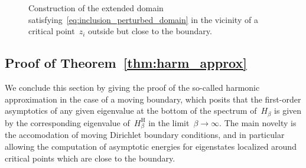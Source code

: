 \documentclass[10pt]{article}
\newcommand{\1}{\mathbbm 1}
\begin{document}
\begin{figure}
{\begin{tikzpicture}
        \end{tikzpicture}
    }
        \caption{Construction of the extended domain satisfying~\eqref{eq:inclusion_perturbed_domain} in the vicinity of a critical point~$z_i$ outside but close to the boundary.}
    \end{figure}

    \subsection{Proof of Theorem~\ref{thm:harm_approx}}
    We conclude this section by giving the proof of the so-called harmonic approximation in the case of a moving boundary, which posits that the first-order asymptotics of any given eigenvalue at the bottom of the spectrum of~$H_\beta$ is given by the corresponding eigenvalue of~$H_\beta^{\mathrm H}$ in the limit~$\beta\to\infty$.
    The main novelty is the accomodation of moving Dirichlet boundary conditions, and in particular allowing the computation of asymptotic energies for eigenstates localized around critical points which are close to the boundary.
\end{document}
